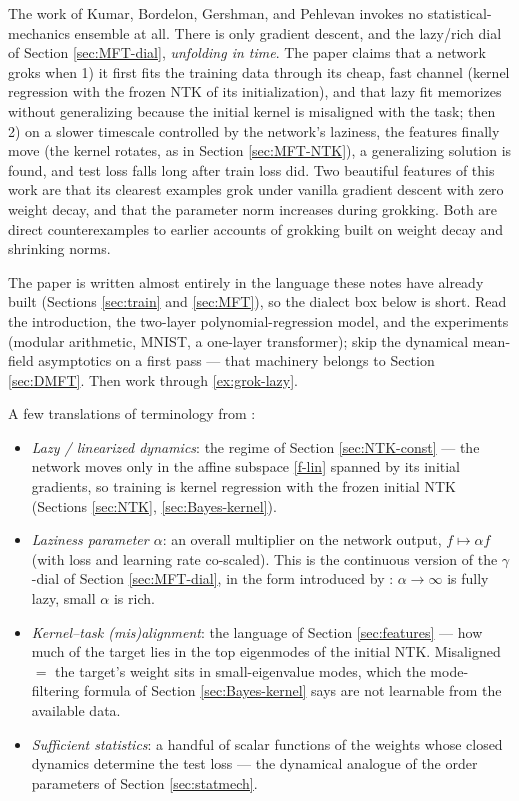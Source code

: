 \documentclass[11pt]{article}
\begin{document}
\medskip
The work of Kumar, Bordelon, Gershman, and Pehlevan \cite{kumar2024grokking} invokes no statistical-mechanics ensemble at all.  There is only gradient descent, and the lazy/rich dial of Section \ref{sec:MFT-dial}, \emph{unfolding in time}. The paper claims that a network groks when 1) it first fits the training data through its cheap, fast channel (kernel regression with the frozen NTK of its initialization), and that lazy fit memorizes without generalizing because the initial kernel is misaligned with the task; then 2) on a slower timescale controlled by the network's laziness, the features finally move (the kernel rotates, as in Section \ref{sec:MFT-NTK}), a generalizing solution is found, and test loss falls long after train loss did. Two beautiful features of this work are that its clearest examples grok under vanilla gradient descent with zero weight decay, and that the parameter norm increases during grokking. Both are direct counterexamples to earlier accounts of grokking built on weight decay and shrinking norms.

The paper is written almost entirely in the language these notes have already built (Sections \ref{sec:train} and \ref{sec:MFT}), so the dialect box below is short. Read the introduction, the two-layer polynomial-regression model, and the experiments (modular arithmetic, MNIST, a one-layer transformer); skip the dynamical mean-field asymptotics on a first pass --- that machinery belongs to Section \ref{sec:DMFT}. Then work through \cref{ex:grok-lazy}.

\begin{callout}[note]
A few translations of terminology from \cite{kumar2024grokking}:
\begin{itemize}
    \item \emph{Lazy / linearized dynamics}: the regime of Section \ref{sec:NTK-const} --- the network moves only in the affine subspace \eqref{f-lin} spanned by its initial gradients, so training is kernel regression with the frozen initial NTK (Sections \ref{sec:NTK}, \ref{sec:Bayes-kernel}).
    \item \emph{Laziness parameter $\alpha$}: an overall multiplier on the network output, $f \mapsto \alpha f$ (with loss and learning rate co-scaled). This is the continuous version of the $\gamma$-dial of Section \ref{sec:MFT-dial}, in the form introduced by \cite{chizat2019lazy}: $\alpha\to\infty$ is fully lazy, small $\alpha$ is rich.
    \item \emph{Kernel--task (mis)alignment}: the language of Section \ref{sec:features} --- how much of the target lies in the top eigenmodes of the initial NTK. Misaligned $=$ the target's weight sits in small-eigenvalue modes, which the mode-filtering formula of Section \ref{sec:Bayes-kernel} says are not learnable from the available data.
    \item \emph{Sufficient statistics}: a handful of scalar functions of the weights whose closed dynamics determine the test loss --- the dynamical analogue of the order parameters of Section \ref{sec:statmech}.
\end{itemize}
\end{callout}
\end{document}
